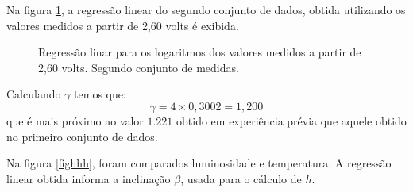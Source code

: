 \documentclass[brazilian,12pt,a4paper,final]{article}
\begin{document}
Na figura \ref{figfimpeq2}, a regressão linear do segundo conjunto de dados, 
obtida utilizando os valores medidos a partir de 2,60 volts é exibida.

\begin{figure}[htbp!]
  \caption{Regressão linar para os logaritmos dos valores medidos a partir de 2,60 volts. Segundo conjunto de medidas.}
  \label{figfimpeq2}
  \centering
\end{figure}

Calculando $\gamma$ temos que:
$$\gamma=4\times 0,3002=1,200$$
que é mais próximo ao valor $1.221$ obtido em experiência prévia que 
aquele obtido no primeiro conjunto de dados.

Na figura \ref{fighhh}, foram comparados luminosidade e temperatura. A regressão linear obtida informa a inclinação $\beta$, usada para o cálculo de $h$.
\end{document}
